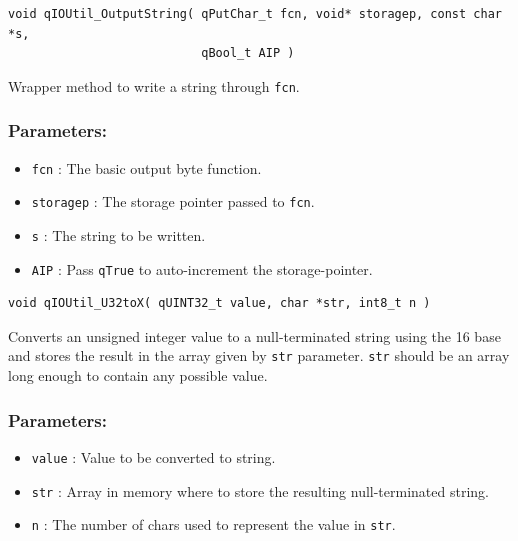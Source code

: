 \documentclass{article}
\begin{document}
\noindent\hrulefill

\begin{lstlisting}[style=CStyle]
void qIOUtil_OutputString( qPutChar_t fcn, void* storagep, const char *s, 
                           qBool_t AIP )
\end{lstlisting}

Wrapper method to write a string through \lstinline{fcn}. 

\subsubsection*{Parameters:}
\begin{itemize}
    \item \lstinline{fcn} : The basic output byte function.
    \item \lstinline{storagep} : The storage pointer passed to \lstinline{fcn}.
    \item \lstinline{s} : The string to be written.
    \item \lstinline{AIP} : Pass \lstinline{qTrue} to auto-increment the storage-pointer.
\end{itemize}

\noindent\hrulefill

\begin{lstlisting}[style=CStyle]
void qIOUtil_U32toX( qUINT32_t value, char *str, int8_t n )
\end{lstlisting}

Converts an unsigned integer value to a null-terminated string using the 16 base and stores the result in the array given by \lstinline{str} parameter. \lstinline{str} should be an array long enough to contain any possible value. 

\subsubsection*{Parameters:}
\begin{itemize}
    \item \lstinline{value} : Value to be converted to string.
    \item \lstinline{str} : Array in memory where to store the resulting null-terminated string.
    \item \lstinline{n} : The number of chars used to represent the value in \lstinline{str}. 
\end{itemize}


\noindent\hrulefill
\end{document}
